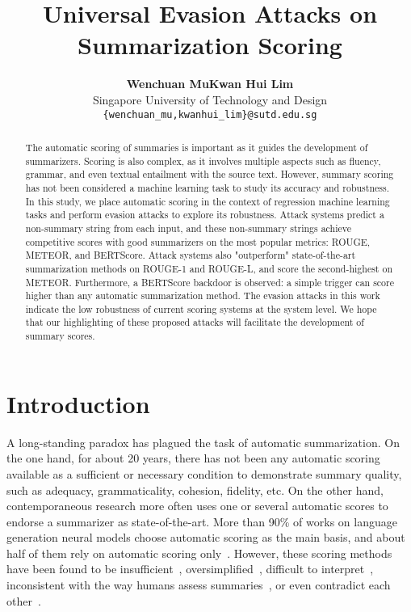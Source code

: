 \documentclass[11pt]{article}
\title{Universal Evasion Attacks on Summarization Scoring}
\author{\textbf{Wenchuan Mu}\quad \textbf{Kwan Hui Lim}\\
Singapore University of Technology and Design \\
\texttt{\{wenchuan\_mu,kwanhui\_lim\}@sutd.edu.sg}\\
}
\theoremstyle{remark}
\begin{document}
\maketitle
\begin{abstract}
The automatic scoring of summaries is important as it guides the development of summarizers. Scoring is also complex, as it involves multiple aspects such as fluency, grammar, and even textual entailment with the source text. However, summary scoring has not been considered a machine learning task to study its accuracy and robustness. In this study, we place automatic scoring in the context of regression machine learning tasks and perform evasion attacks to explore its robustness. Attack systems predict a non-summary string from each input, and these non-summary strings achieve competitive scores with good summarizers on the most popular metrics: ROUGE, METEOR, and BERTScore. Attack systems also "outperform" state-of-the-art summarization methods on ROUGE-1 and ROUGE-L, and score the second-highest on METEOR. Furthermore, a BERTScore backdoor is observed: a simple trigger can score higher than any automatic summarization method. The evasion attacks in this work indicate the low robustness of current scoring systems at the system level. We hope that our highlighting of these proposed attacks will facilitate the development of summary scores.
\end{abstract}

\section{Introduction}

A long-standing paradox has plagued the task of automatic summarization. On the one hand, for about 20 years, there has not been any automatic scoring available as a sufficient or necessary condition to demonstrate summary quality, such as adequacy, grammaticality, cohesion, fidelity, etc. On the other hand, contemporaneous research more often uses one or several automatic scores to endorse a summarizer as state-of-the-art. More than 90\% of works on language generation neural models choose automatic scoring as the main basis, and about half of them rely on automatic scoring only~\cite{van2021human}. However, these scoring methods have been found to be insufficient~\cite{novikova-etal-2017-need}, oversimplified~\cite{van2021human}, difficult to interpret~\cite{sai2022survey}, inconsistent with the way humans assess summaries~\cite{rankel-etal-2013-decade,bohm-etal-2019-better}, or even contradict each other~\cite{gehrmann-etal-2021-gem,bhandari-etal-2020-metrics}.
\end{document}
